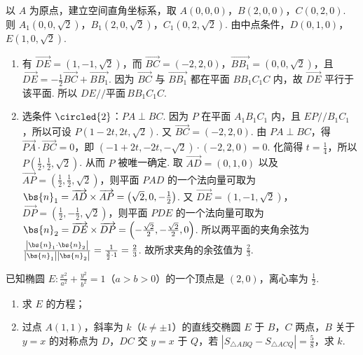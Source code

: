 \documentclass[UTF8,a4paper,oneside,11pt]{ctexbook}
\begin{document}
\begin{solution}
以 \(A\) 为原点，建立空间直角坐标系，取 \( A\left( 0,0,0 \right) \)，\( B\left( 2,0,0 \right) \)，\( C\left( 0,2,0 \right) \). 则 \( A_1\left( 0,0,\sqrt{2} \right) \)，\( B_1\left( 2,0,\sqrt{2} \right) \)，\( C_1\left( 0,2,\sqrt{2} \right) \). 由中点条件，\( D\left( 0,1,0 \right) \)，\( E\left( 1,0,\sqrt{2} \right) \).

\begin{enumerate}
\item 有 \( \overrightarrow{DE}=\left( 1,-1,\sqrt{2} \right) \)，而 \( \overrightarrow{BC}=\left( -2,2,0 \right) \)，\( \overrightarrow{BB_1}=\left( 0,0,\sqrt{2} \right) \)，且 \( \overrightarrow{DE}=-\frac{1}{2}\overrightarrow{BC}+\overrightarrow{BB_1} \).
因为 \( \overrightarrow{BC} \) 与 \( \overrightarrow{BB_1} \) 都在平面 \(BB_1C_1C\) 内，故 \( \overrightarrow{DE} \) 平行于该平面. 所以 \( DE // \text{平面}\, BB_1C_1C \).

\item 选条件 \(\circled{2}\)：\( PA\perp BC \).
因为 \(P\) 在平面 \(A_1B_1C_1\) 内，且 \( EP//B_1C_1 \)，所以可设 \( P\left( 1-2t,2t,\sqrt{2} \right) \). 又 \( \overrightarrow{BC}=\left( -2,2,0 \right) \). 由 \( PA\perp BC \)，得 \( \overrightarrow{PA}\cdot \overrightarrow{BC}=0 \)，即 \( \left( -1+2t,-2t,-\sqrt{2} \right)\cdot \left( -2,2,0 \right)=0 \). 化简得 \( t=\frac{1}{4} \)，所以 \( P\left( \frac{1}{2},\frac{1}{2},\sqrt{2} \right) \).
从而 \(P\) 被唯一确定.
取 \( \overrightarrow{AD}=\left( 0,1,0 \right) \) 以及 \( \overrightarrow{AP}=\left( \frac{1}{2},\frac{1}{2},\sqrt{2} \right) \)，则平面 \(PAD\) 的一个法向量可取为 \( \bs{n}_1=\overrightarrow{AD}\times \overrightarrow{AP}=\left( \sqrt{2},0,-\frac{1}{2} \right) \).
又 \( \overrightarrow{DE}=\left( 1,-1,\sqrt{2} \right) \)，\( \overrightarrow{DP}=\left( \frac{1}{2},-\frac{1}{2},\sqrt{2} \right) \)，则平面 \(PDE\) 的一个法向量可取为 \( \bs{n}_2=\overrightarrow{DE}\times \overrightarrow{DP}=\left( -\frac{\sqrt{2}}{2},-\frac{\sqrt{2}}{2},0 \right) \). 所以两平面的夹角余弦为 \( \frac{\left| \bs{n}_1\cdot \bs{n}_2 \right|}{\left| \bs{n}_1 \right|\left| \bs{n}_2 \right|}=\frac{1}{\frac{3}{2}\cdot 1}=\frac{2}{3} \).
故所求夹角的余弦值为 \( \frac{2}{3} \).
\end{enumerate}
\end{solution}

\begin{problem}
已知椭圆 \( E:\frac{x^2}{a^2}+\frac{y^2}{b^2}=1 \)（\( a>b>0 \)）的一个顶点是 \( \left( 2,0 \right) \)，离心率为 \( \frac{1}{2} \).

\begin{enumerate}
\item 求 \(E\) 的方程；
\item 过点 \( A\left( 1,1 \right) \)，斜率为 \( k \)（\( k\neq \pm 1 \)）的直线交椭圆 \(E\) 于 \(B\)，\(C\) 两点，\(B\) 关于 \( y=x \) 的对称点为 \(D\)，\(DC\) 交 \( y=x \) 于 \(Q\)，若 \( \left| S_{\triangle ABQ}-S_{\triangle ACQ} \right|=\frac{5}{8} \)，求 \( k \).
\end{enumerate}
\end{problem}
\end{document}
